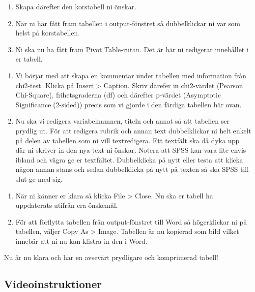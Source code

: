 \documentclass[
]{book}
\begin{document}
\begin{enumerate}
\def\labelenumi{\arabic{enumi}.}
\setcounter{enumi}{2}
\item
  Skapa därefter den korstabell ni önskar.
\item
  När ni har fått fram tabellen i output-fönstret så dubbelklickar ni var som helst på korstabellen.
\item
  Ni ska nu ha fått fram Pivot Table-rutan. Det är här ni redigerar innehållet i er tabell.
\end{enumerate}

\begin{enumerate}
\def\labelenumi{\arabic{enumi}.}
\setcounter{enumi}{5}
\item
  Vi börjar med att skapa en kommentar under tabellen med information från chi2-test. Klicka på Insert \textgreater{} Caption. Skriv därefer in chi2-värdet (Pearson Chi-Square), frihetsgraderna (df) och därefter p-värdet (Asymptotic Significance (2-sided)) precis som vi gjorde i den färdiga tabellen här ovan.
\item
  Nu ska vi redigera variabelnamnen, titeln och annat så att tabellen ser prydlig ut. För att redigera rubrik och annan text dubbelklickar ni helt enkelt på delen av tabellen som ni vill textredigera. Ett textfält ska då dyka upp där ni skriver in den nya text ni önskar. Notera att SPSS kan vara lite envis ibland och vägra ge er textfältet. Dubbelklicka på nytt eller testa att klicka någon annan stans och sedan dubbelklicka på nytt på texten så ska SPSS till slut ge med sig.
\end{enumerate}

\begin{enumerate}
\def\labelenumi{\arabic{enumi}.}
\setcounter{enumi}{7}
\item
  När ni känner er klara så klicka File \textgreater{} Close. Nu ska er tabell ha uppdaterats utifrån era önskemål.
\item
  För att förflytta tabellen från output-fönstret till Word så högerklickar ni på tabellen, väljer Copy As \textgreater{} Image. Tabellen är nu kopierad som bild vilket innebär att ni nu kan klistra in den i Word.
\end{enumerate}

Nu är nu klara och har en avsevärt prydligare och komprimerad tabell!

\hypertarget{videoinstruktioner-11}{%
\subsection{Videoinstruktioner}\label{videoinstruktioner-11}}
\end{document}
